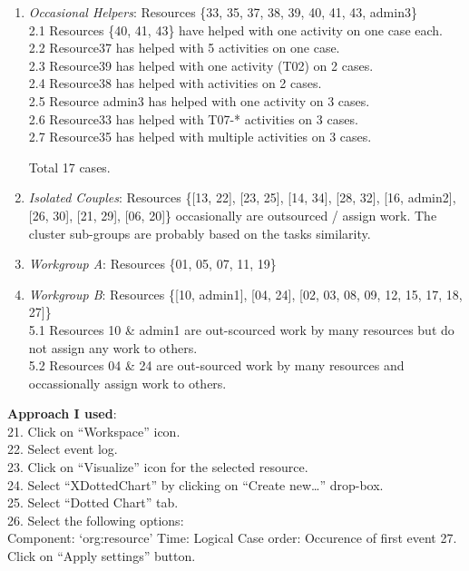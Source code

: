 \documentclass[]{article}
\begin{document}
\begin{enumerate}
\def\labelenumi{\arabic{enumi}.}
\setcounter{enumi}{1}
\item
  \emph{Occasional Helpers}: Resources \{33, 35, 37, 38, 39, 40, 41, 43,
  admin3\}\\2.1 Resources \{40, 41, 43\} have helped with one activity
  on one case each.\\2.2 Resource37 has helped with 5 activities on one
  case.\\2.3 Resource39 has helped with one activity (T02) on 2
  cases.\\2.4 Resource38 has helped with activities on 2 cases.\\2.5
  Resource admin3 has helped with one activity on 3 cases.\\2.6
  Resource33 has helped with T07-* activities on 3 cases.\\2.7
  Resource35 has helped with multiple activities on 3 cases.

  Total 17 cases.
\item
  \emph{Isolated Couples}: Resources \{{[}13, 22{]}, {[}23, 25{]},
  {[}14, 34{]}, {[}28, 32{]}, {[}16, admin2{]}, {[}26, 30{]}, {[}21,
  29{]}, {[}06, 20{]}\} occasionally are outsourced / assign work. The
  cluster sub-groups are probably based on the tasks similarity.
\item
  \emph{Workgroup A}: Resources \{01, 05, 07, 11, 19\}
\item
  \emph{Workgroup B}: Resources \{{[}10, admin1{]}, {[}04, 24{]}, {[}02,
  03, 08, 09, 12, 15, 17, 18, 27{]}\}\\5.1 Resources 10 \& admin1 are
  out-scourced work by many resources but do not assign any work to
  others.\\5.2 Resources 04 \& 24 are out-sourced work by many resources
  and occassionally assign work to others.
\end{enumerate}

\textbf{Approach I used}:\\21. Click on ``Workspace'' icon.\\22. Select
event log.\\23. Click on ``Visualize'' icon for the selected
resource.\\24. Select ``XDottedChart'' by clicking on ``Create
new\ldots{}'' drop-box.\\25. Select ``Dotted Chart'' tab.\\26. Select
the following options:\\ Component: `org:resource' Time: Logical Case
order: Occurence of first event 27. Click on ``Apply settings'' button.
\end{document}
